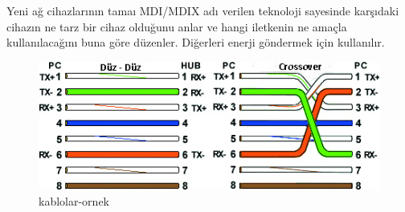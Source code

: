 Yeni ağ cihazlarının tamaı MDI/MDIX adı verilen teknoloji sayesinde karşıdaki cihazın ne tarz bir cihaz olduğunu anlar ve hangi iletkenin ne amaçla kullanılacağını buna göre  düzenler. 
Diğerleri enerji göndermek için kullanılır.\\

\begin{figure}[!ht]
  \includegraphics{images/ethcable}
 \caption{kablolar-ornek}
 \label{fig:caprazduz_kablo_ornek_gosterim}
\end{figure}
